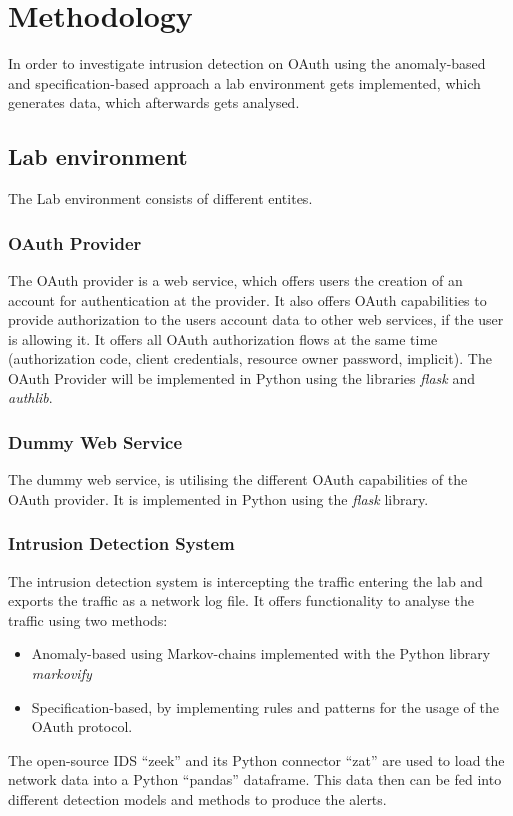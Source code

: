 \documentclass{article}
\begin{document}
 
\section{Methodology}
In order to investigate intrusion detection on OAuth using the anomaly-based and specification-based approach a lab environment gets implemented, which generates data, which afterwards gets analysed.
\subsection{Lab environment}
The Lab environment consists of different entites.

\subsubsection{OAuth Provider}
The OAuth provider is a web service, which offers users the creation of an account for authentication at the provider. It also offers OAuth capabilities to provide authorization to the users account data to other web services, if the user is allowing it. It offers all OAuth authorization flows at the same time (authorization code, client credentials, resource owner password, implicit). The OAuth Provider will be implemented in Python using the libraries \emph{flask} and \emph{authlib}.

\subsubsection{Dummy Web Service}
The dummy web service, is utilising the different OAuth capabilities of the OAuth provider. It is implemented in Python using the \emph{flask} library.

\subsubsection{Intrusion Detection System}
The intrusion detection system is intercepting the traffic entering the lab and exports the traffic as a network log file. It offers functionality to analyse the traffic using two methods:
\begin{itemize}
    \item Anomaly-based using Markov-chains implemented with the Python library \emph{markovify}
    \item Specification-based, by implementing rules and patterns for the usage of the OAuth protocol.
\end{itemize}
The open-source IDS ``zeek'' and its Python connector ``zat'' are used to load the network data into a Python ``pandas'' dataframe. This data then can be fed into different detection models and methods to produce the alerts.
\end{document}
